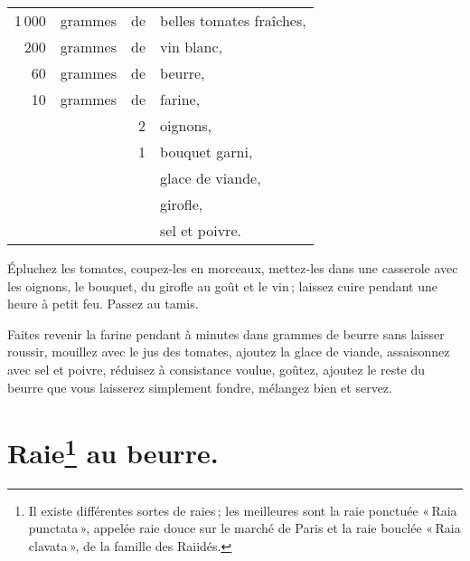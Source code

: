 \medskip

\footnotesize
\begin{longtable}{rrrp{16em}}
  1 000 & grammes & de & belles tomates fraîches,                                                         \\
    200 & grammes & de & vin blanc,                                                                       \\
     60 & grammes & de & beurre,                                                                          \\
     10 & grammes & de & farine,                                                                          \\
        &         &  2 & oignons,                                                                         \\
        &         &  1 & bouquet garni,                                                                   \\
        &         &    & glace de viande,                                                                 \\
        &         &    & girofle,                                                                         \\
        &         &    & sel et poivre.                                                                   \\
\end{longtable}
\normalsize

Épluchez les tomates, coupez-les en morceaux, mettez-les dans une casserole
avec les oignons, le bouquet, du girofle au goût et le vin ; laissez cuire
pendant une heure à petit feu. Passez au tamis.

Faites revenir la farine pendant {\mmm} à {\mmm} minutes dans
{\mmm} grammes de beurre sans laisser roussir, mouillez avec le jus des
tomates, ajoutez la glace de viande, assaisonnez avec sel et poivre, réduisez
à consistance voulue, goûtez, ajoutez le reste du beurre que vous laisserez
simplement fondre, mélangez bien et servez.

\section*{\centering Raie\footnote{Il existe différentes sortes de raies ; les
meilleures sont la raie ponctuée « Raia punctata », appelée raie douce sur le
marché de Paris et la raie bouclée « Raia clavata », de la famille des Raiidés.}
au beurre.}

